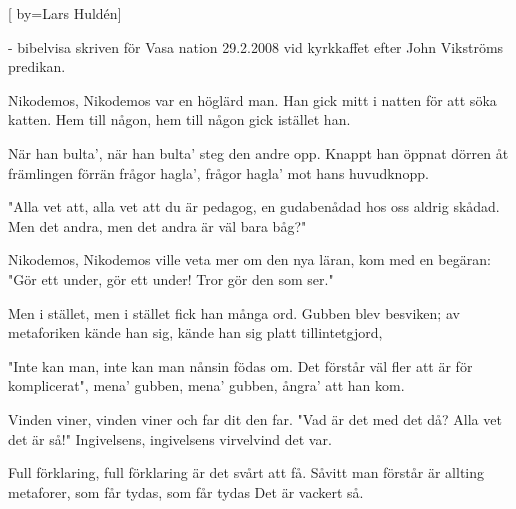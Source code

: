 

[
	by={Lars Huldén}] 

\beginverse*
- bibelvisa skriven för Vasa nation 29.2.2008 vid kyrkkaffet efter John Vikströms predikan.
\endverse

\beginverse*
Nikodemos, Nikodemos
var en höglärd man.
Han gick mitt i natten
för att söka katten.
Hem till någon, hem till någon
gick istället han.
\endverse

\beginverse*
När han bulta', när han bulta' 
steg den andre opp.
Knappt han öppnat dörren
åt främlingen förrän
frågor hagla', frågor hagla' 
mot hans huvudknopp.
\endverse

\beginverse*
"Alla vet att, alla vet att
du är pedagog,
en gudabenådad
hos oss aldrig skådad.
Men det andra, men det andra
är väl bara båg?"
\endverse

\beginverse*
Nikodemos, Nikodemos
ville veta mer
om den nya läran,
kom med en begäran:
"Gör ett under, gör ett under!
Tror gör den som ser."
\endverse

\beginverse*
Men i stället, men i stället
fick han många ord.
Gubben blev besviken;
av metaforiken
kände han sig, kände han sig
platt tillintetgjord,
\endverse

\beginverse*
"Inte kan man, inte kan man
nånsin födas om.
Det förstår väl fler att
är för komplicerat",
mena' gubben, mena' gubben,
ångra' att han kom.
\endverse

\beginverse*
Vinden viner, vinden viner
och far dit den far.
"Vad är det med det då?
Alla vet det är så!"
Ingivelsens, ingivelsens
virvelvind det var.
\endverse

\beginverse*
Full förklaring, full förklaring
är det svårt att få.
Såvitt man förstår är
allting metaforer,
som får tydas, som får tydas
Det är vackert så.
\endverse
\endsong
